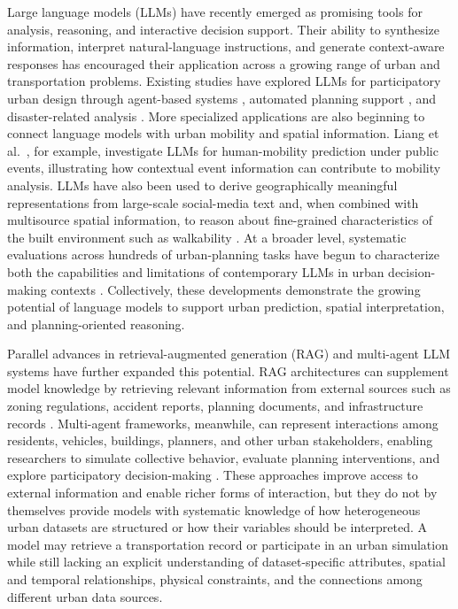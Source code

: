 \documentclass[a4paper,fleqn]{cas-sc}
\begin{document}
Large language models (LLMs) have recently emerged as promising tools for analysis, reasoning, and interactive decision support. Their ability to synthesize information, interpret natural-language instructions, and generate context-aware responses has encouraged their application across a growing range of urban and transportation problems. Existing studies have explored LLMs for participatory urban design through agent-based systems \cite{zhou2024llm}, automated planning support \cite{zhu2024plangpt}, and disaster-related analysis \cite{zhu2024survey}. More specialized applications are also beginning to connect language models with urban mobility and spatial information. Liang et al.~\cite{liang2024mobility}, for example, investigate LLMs for human-mobility prediction under public events, illustrating how contextual event information can contribute to mobility analysis. LLMs have also been used to derive geographically meaningful representations from large-scale social-media text \cite{berragan2024semantic} and, when combined with multisource spatial information, to reason about fine-grained characteristics of the built environment such as walkability \cite{ki2025walkability}. At a broader level, systematic evaluations across hundreds of urban-planning tasks have begun to characterize both the capabilities and limitations of contemporary LLMs in urban decision-making contexts \cite{zhao2025urbanplanning}. Collectively, these developments demonstrate the growing potential of language models to support urban prediction, spatial interpretation, and planning-oriented reasoning.

Parallel advances in retrieval-augmented generation (RAG) and multi-agent LLM systems have further expanded this potential. RAG architectures can supplement model knowledge by retrieving relevant information from external sources such as zoning regulations, accident reports, planning documents, and infrastructure records \cite{lewis2020rag}. Multi-agent frameworks, meanwhile, can represent interactions among residents, vehicles, buildings, planners, and other urban stakeholders, enabling researchers to simulate collective behavior, evaluate planning interventions, and explore participatory decision-making \cite{zhou2024llm, park2023generative}. These approaches improve access to external information and enable richer forms of interaction, but they do not by themselves provide models with systematic knowledge of how heterogeneous urban datasets are structured or how their variables should be interpreted. A model may retrieve a transportation record or participate in an urban simulation while still lacking an explicit understanding of dataset-specific attributes, spatial and temporal relationships, physical constraints, and the connections among different urban data sources.
\end{document}
